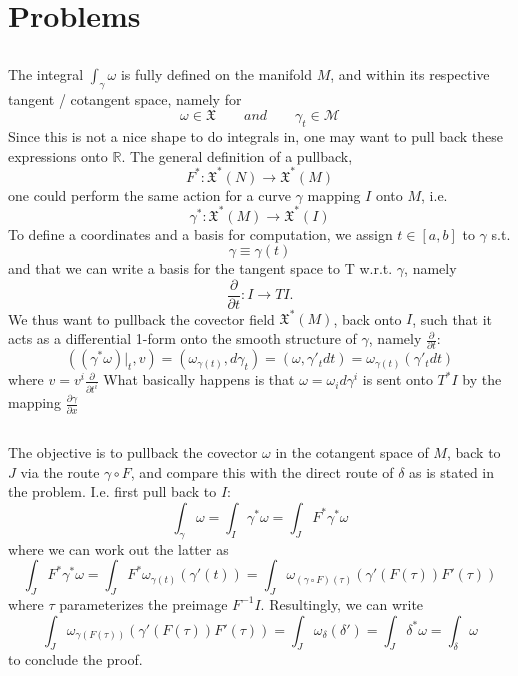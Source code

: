 \section{Problems}
\subsection{}
The integral $\int_{\gamma}\omega$ is fully defined on the manifold $M$, and within its respective tangent / cotangent space, namely for
\[
\omega \in \mathfrak{X} \qquad and \qquad \gamma_t \in \mathcal{M}
\]  
Since this is not a nice shape to do integrals in, one may want to pull back these expressions onto $\mathbb{R}$. 
The general definition of a pullback,
\[ F^* : \mathfrak{X}^*(N) \rightarrow \mathfrak{X}^*(M) \]
one could perform the same action for a curve $\gamma$ mapping $I$ onto $M$, i.e.
\[ \gamma^* : \mathfrak{X}^*(M) \rightarrow \mathfrak{X}^*(I) \]
To define a coordinates and a basis for computation, we assign $t\in[a, b]$ to $\gamma$ s.t.
\[ \gamma \equiv \gamma(t)\]
and that we can write a basis for the tangent space to T w.r.t. $\gamma$, namely
\[ \frac{\partial}{\partial t} : I \rightarrow TI.\]
We thus want to pullback the covector field  $\mathfrak{X}^*(M)$, back onto $I$, such that it acts as a differential 1-form onto the smooth structure of $\gamma$, namely $\frac{\partial }{\partial t}$:
\[ 
	\left((\gamma^*\omega)\bigr\rvert_t,  v \right) = \left(\omega_{\gamma(t)}, d\gamma_t\right) =  \left(\omega, \gamma' _tdt\right) = \omega_{\gamma(t)}\left(\gamma'_tdt\right)
\] 
where $v = v^i\frac{\partial}{\partial t^i}$
What basically happens is that $\omega = \omega_id\gamma^i$ is sent onto $T^*I$ by the mapping $\frac{\partial \gamma}{\partial x}$

\subsection{}
The objective is to pullback the covector $\omega$ in the cotangent space of $M$, back to $J$ via the route $\gamma \circ F $, and compare this with the direct route of $\delta$ as is stated in the problem. I.e. first pull back to $I$:
\[ \int_\gamma \omega = \int_I \gamma^*\omega = \int_J F^* \gamma^*\omega\]
where we can work out the latter as
\[\int_J F^*\gamma^*\omega = \int_J F^* \omega_{\gamma(t)}(\gamma'(t)) = \int_J\omega_{(\gamma\circ F)(\tau)}\left( \gamma'(F(\tau))F'(\tau)  \right) \]
where $\tau$ parameterizes the preimage  $F^{-1}I$.
Resultingly, we can write
\[\int_J\omega_{\gamma(F(\tau))}\left( \gamma'(F(\tau))F'(\tau)  \right) =  \int_J \omega_{\delta}(\delta') = \int_J \delta^*\omega = \int_\delta \omega\]
to conclude the proof.
